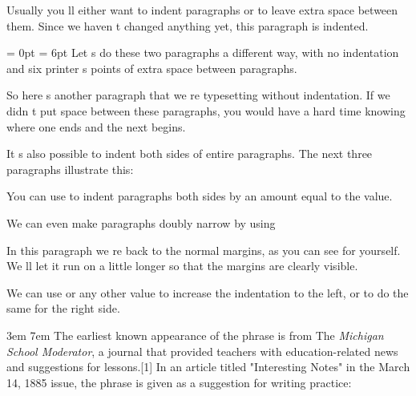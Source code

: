 {Usually you ll either want to indent paragraphs or to leave
extra space between them. Since we haven t changed anything
yet, this paragraph is indented.

{\parindent = 0pt \parskip = 6pt
Let s do these two paragraphs a different way,
with no indentation and six printer s points of extra space
between paragraphs.}

So here s another paragraph that we re typesetting without
indentation. If we didn t put space between these paragraphs,
you would have a hard time knowing where one ends
and the next begins.

\par %
It s also possible to indent both sides of entire paragraphs.
The next three paragraphs illustrate this:

\smallskip %

\begin{macro}{\narrower}
You can use  to indent paragraphs both sides by 
an amount equal to the
 value.
\end{macro}

\medskip

{\narrower\small
\dogs\par}

\medskip

We can even make paragraphs doubly narrow by using   

{\narrower \narrower\small  \dogs \par}
\medskip

In this paragraph we re back to the normal margins, as you can
see for yourself. We ll let it run on a little longer so that
the margins are clearly visible.

We can use  or any other value to increase the indentation to the left, or
 to do the same for the right side.



\medskip

\topline

{ \leftskip 3em \rightskip 7em \small 
The earliest known appearance of the phrase is from The {\em  Michigan School Moderator}\cite{Michigan1880}, a journal that provided teachers with education-related news and suggestions for lessons.[1] In an article titled "Interesting Notes" in the March 14, 1885 issue, the phrase is given as a suggestion for writing practice: 

}}
